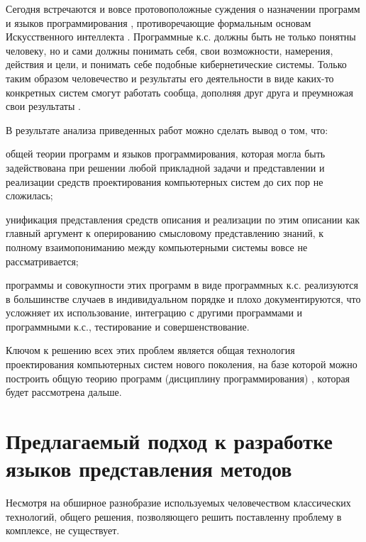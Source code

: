 Сегодня встречаются и вовсе протовоположные суждения о назначении программ и языков программирования \cite{Rapaport2020}, противоречающие формальным основам Искусственного интеллекта \cite{Grimmelmann2022}. Программные к.с. должны быть не только понятны человеку, но и сами должны понимать себя, свои возможности, намерения, действия и цели, и понимать себе подобные кибернетические системы. Только таким образом человечество и результаты его деятельности в виде каких-то конкретных систем смогут работать сообща, дополняя друг друга и преумножая свои результаты \cite{Golenkov2012}.

В результате анализа приведенных работ можно сделать вывод о том, что:
\begin{textitemize}
    \item общей теории программ и языков программирования, которая могла быть задействована при решении любой прикладной задачи и представлении и реализации средств проектирования компьютерных систем до сих пор не сложилась;
    \item унификация представления средств описания и реализации по этим описании как главный аргумент к оперированию смысловому представлению знаний, к полному взаимопониманию между компьютерными системы вовсе не рассматривается;
    \item программы и совокупности этих программ в виде программных к.с. реализуются в большинстве случаев в индивидуальном порядке и плохо документируются, что усложняет их использование, интеграцию с другими программами и программными к.с., тестирование и совершенствование.
\end{textitemize}

Ключом к решению всех этих проблем является общая технология проектирования компьютерных систем нового поколения, на базе которой можно построить общую теорию программ (дисциплину программирования) \cite{Deikstra1978}, которая будет рассмотрена дальше.

\section{Предлагаемый подход к разработке языков представления методов}
\label{sec_programs_solution}

Несмотря на обширное разнобразие используемых человечеством классических технологий, общего решения, позволяющего решить поставленну проблему в комплексе, не существует.

